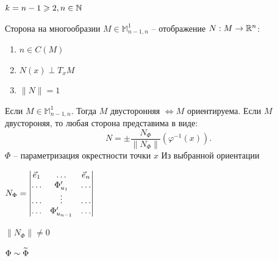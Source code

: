 \begin{statement}
    $k = n-1\geqslant 2, n\in \mathbb{N}$

    Сторона на многообразии $M\in \mathds M_{n-1, n}^1$ -- отображение  $N: M \to \mathbb{R}^n$:
    \begin{enumerate}
        \item $n\in C\left( M \right) $
        \item $N(x) \perp T_x M$ 
        \item $\|N\| = 1$
    \end{enumerate}

    Если $M\in \mathds M_{n-1, n}^1$. Тогда $M$ двусторонняя $\iff M$ ориентируема. Если $M$ двустороняя, то любая сторона представима в виде:
    \[
        N = \pm\frac{N_{\Phi}}{\|N_\Phi\|}\left( \varphi^{-1}(x) \right) 
    .\] 
    $\Phi$ -- параметризация окрестности точки  $x$ Из выбранной ориентации  

    $N_\Phi = 
    \begin{vmatrix}
        \vec e_1 & \ldots & \vec e_n\\
        \ldots & \Phi^{\prime}_{u_1} & \ldots\\
        \ldots& \vdots & \ldots\\
        \ldots & \Phi^{\prime}_{u_{n-1}}& \ldots
    \end{vmatrix}$

    $\|N_{\Phi}\| \neq 0$

    $\Phi \sim \widetilde{\Phi}$


    
\end{statement}
